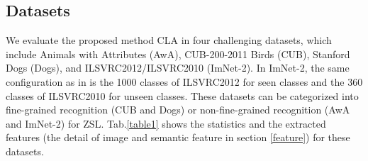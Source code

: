 \documentclass[review]{elsarticle}
\begin{document}
\subsection{Datasets}
We evaluate the proposed method CLA in four challenging datasets, which include Animals with Attributes (AwA)\cite{Lampert2014}, CUB-200-2011 Birds (CUB)\cite{Wah2011The}, Stanford Dogs (Dogs)\cite{Deng2013Fine}, and ILSVRC2012/ILSVRC2010 (ImNet-2)\cite{Russakovsky2015ImageNet}. In ImNet-2, the same configuration as in \cite{Kodirov2017} is the 1000 classes of ILSVRC2012 for seen classes and the 360 classes of ILSVRC2010 for unseen classes. These datasets can be categorized into fine-grained recognition (CUB and Dogs) or non-fine-grained recognition (AwA and ImNet-2) for ZSL. Tab.\ref{table1} shows the statistics and the extracted features (the detail of image and semantic feature in section \ref{feature}) for these datasets.
\end{document}
